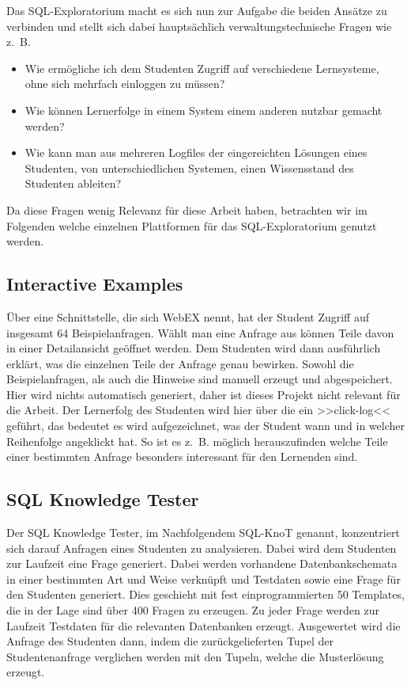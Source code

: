 Das SQL-Exploratorium macht es sich nun zur Aufgabe die beiden Ansätze zu verbinden und stellt sich dabei hauptsächlich verwaltungstechnische Fragen wie \mbox{z. B.} 

\begin{itemize}
\item Wie ermögliche ich dem Studenten Zugriff auf verschiedene Lernsysteme, ohne sich mehrfach einloggen zu müssen?
\item Wie können Lernerfolge in einem System einem anderen nutzbar gemacht werden?
\item Wie kann man aus mehreren Logfiles der eingereichten Lösungen eines Studenten, von unterschiedlichen Systemen, einen Wissensstand des Studenten ableiten?
\end{itemize}

Da diese Fragen wenig Relevanz für diese Arbeit haben, betrachten wir im Folgenden welche einzelnen Plattformen für das SQL-Exploratorium genutzt werden.

\subsection{Interactive Examples}

Über eine Schnittstelle, die sich WebEX nennt, hat der Student Zugriff auf insgesamt 64 Beispielanfragen. Wählt man eine Anfrage aus können Teile davon in einer Detailansicht geöffnet werden. Dem Studenten wird dann ausführlich erklärt, was die einzelnen Teile der Anfrage genau bewirken. Sowohl die Beispielanfragen, als auch die Hinweise sind manuell erzeugt und abgespeichert. Hier wird nichts automatisch generiert, daher ist dieses Projekt nicht relevant für die Arbeit. Der Lernerfolg des Studenten wird hier über die ein >>click-log<< geführt, das bedeutet es wird aufgezeichnet, was der Student wann und in welcher Reihenfolge angeklickt hat. So ist es \mbox{z. B.} möglich herauszufinden welche Teile einer bestimmten Anfrage besonders interessant für den Lernenden sind.

\subsection{SQL Knowledge Tester}

Der SQL Knowledge Tester, im Nachfolgendem SQL-KnoT genannt, konzentriert sich darauf Anfragen eines Studenten zu analysieren. Dabei wird dem Studenten zur Laufzeit eine Frage generiert. Dabei werden vorhandene Datenbankschemata in einer bestimmten Art und Weise verknüpft und Testdaten sowie eine Frage für den Studenten generiert. Dies geschieht mit fest einprogrammierten 50 Templates, die in der Lage sind über 400 Fragen zu erzeugen. Zu jeder Frage werden zur Laufzeit Testdaten für die relevanten Datenbanken erzeugt. Ausgewertet wird die Anfrage des Studenten dann, indem die zurückgelieferten Tupel der Studentenanfrage verglichen werden mit den Tupeln, welche die Musterlösung erzeugt. 

